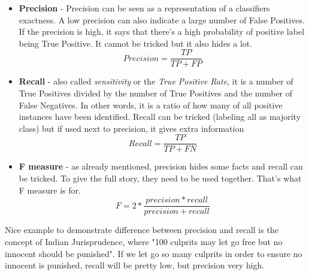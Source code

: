 \begin{itemize}
\item \textbf{Precision} - Precision can be seen as a representation of a classifiers exactness. A low precision can also indicate a large number of False Positives. If the precision is high, it says that there's a high probability of positive label being True Positive. It cannot be tricked but it also hides a lot.
\[ Precision = \frac{TP}{TP + FP}\]
\item \textbf{Recall} - also called \textit{sensitivity} or the \textit{True Positive Rate}, it is a number of True Positives divided by the number of True Positives and the number of False Negatives. In other words, it is a ratio of how many of all positive instances have been identified. Recall can be tricked (labeling all as majority class) but if used next to precision, it gives extra information
\[ Recall = \frac{TP}{TP + FN}\]
\item \textbf{F measure} - as already mentioned, precision hides some facts and recall can be tricked. To give the full story, they need to be used together. That's what F measure is for.
\[ F = 2 * \frac{precision * recall}{precision + recall}\]
\end{itemize}Nice example to demonstrate difference between precision and recall is the concept of Indian Jurisprudence, where "100 culprits may let go free but no innocent should be punished". If we let go so many culprits in order to ensure no innocent is punished, recall will be pretty low, but precision very high.